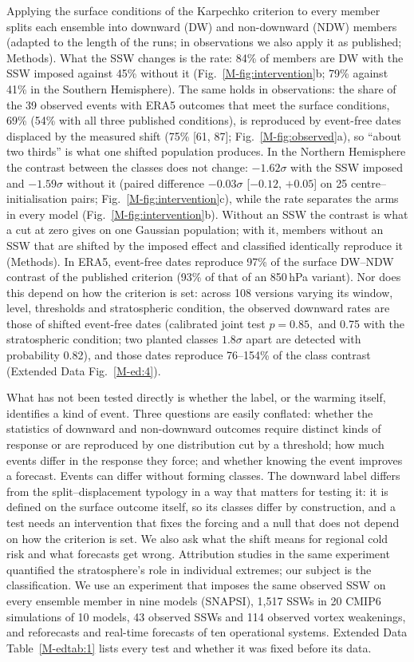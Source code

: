 \documentclass[11pt]{article}
\begin{document}
Applying the surface conditions of the Karpechko criterion to every member splits each ensemble into downward (DW) and non-downward (NDW) members (adapted to the length of the runs; in observations we also apply it as published; Methods). What the SSW changes is the rate: 84\% of members are DW with the SSW imposed against 45\% without it (Fig.~\ref{M-fig:intervention}b; 79\% against 41\% in the Southern Hemisphere). The same holds in observations: the share of the 39 observed events with ERA5 outcomes that meet the surface conditions, 69\% (54\% with all three published conditions), is reproduced by event-free dates displaced by the measured shift (75\% [61, 87]; Fig.~\ref{M-fig:observed}a), so “about two thirds” is what one shifted population produces. In the Northern Hemisphere the contrast between the classes does not change: $-1.62\sigma$ with the SSW imposed and $-1.59\sigma$ without it (paired difference $-0.03\sigma$ [$-0.12$, $+0.05$] on 25 centre–initialisation pairs; Fig.~\ref{M-fig:intervention}c), while the rate separates the arms in every model (Fig.~\ref{M-fig:intervention}b). Without an SSW the contrast is what a cut at zero gives on one Gaussian population; with it, members without an SSW that are shifted by the imposed effect and classified identically reproduce it (Methods). In ERA5, event-free dates reproduce 97\% of the surface DW–NDW contrast of the published criterion (93\% of that of an 850\,hPa variant\cite{lu26}). Nor does this depend on how the criterion is set: across 108 versions varying its window, level, thresholds and stratospheric condition, the observed downward rates are those of shifted event-free dates (calibrated joint test $p = 0.85,$ and 0.75 with the stratospheric condition; two planted classes $1.8\sigma$ apart are detected with probability 0.82), and those dates reproduce 76–154\% of the class contrast (Extended Data Fig.~\ref{M-ed:4}).

What has not been tested directly is whether the label, or the warming itself, identifies a kind of event. Three questions are easily conflated: whether the statistics of downward and non-downward outcomes require distinct kinds of response or are reproduced by one distribution cut by a threshold; how much events differ in the response they force; and whether knowing the event improves a forecast. Events can differ without forming classes. The downward label differs from the split–displacement typology in a way that matters for testing it: it is defined on the surface outcome itself, so its classes differ by construction, and a test needs an intervention that fixes the forcing and a null that does not depend on how the criterion is set. We also ask what the shift means for regional cold risk and what forecasts get wrong. Attribution studies in the same experiment quantified the stratosphere's role in individual extremes\cite{seviour26}; our subject is the classification. We use an experiment that imposes the same observed SSW on every ensemble member in nine models (SNAPSI\cite{hitchcock22}), 1,517 SSWs in 20 CMIP6 simulations of 10 models, 43 observed SSWs and 114 observed vortex weakenings, and reforecasts and real-time forecasts of ten operational systems. Extended Data Table~\ref{M-edtab:1} lists every test and whether it was fixed before its data.
\end{document}
